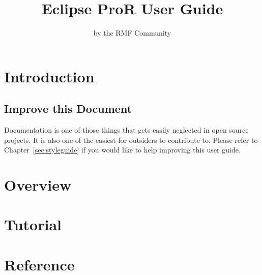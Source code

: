 \documentclass[twoside,10pt]{book}
\title{Eclipse ProR User Guide}
\author{by the RMF Community}
\begin{document}
        

\maketitle

\tableofcontents

\chapter{Introduction}





\section{Improve this Document}
Documentation is one of those things that gets easily neglected in open source projects.
It is also one of the easiest for outsiders to contribute to.  Please refer to
Chapter~\ref{sec:styleguide} if you would like to help improving this user guide.




\chapter{Overview}
\label{sec:overview}


\chapter{Tutorial}
\label{sec:tutorial}


\chapter{Reference}
\end{document}
